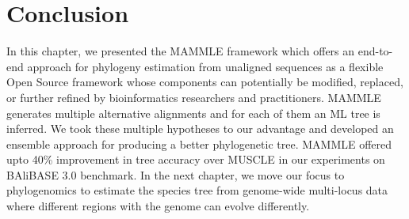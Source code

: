 \section{Conclusion}
In this chapter, we presented the MAMMLE framework which offers an end-to-end approach for phylogeny estimation from unaligned sequences as a flexible Open Source framework whose components can potentially be modified, replaced, or further refined by bioinformatics researchers and practitioners. MAMMLE generates multiple alternative alignments and for each of them an ML tree is inferred. We took these multiple hypotheses to our advantage and developed an ensemble approach for producing a better phylogenetic tree. MAMMLE offered upto 40\% improvement in tree accuracy over MUSCLE in our experiments on BAliBASE 3.0 benchmark.
In the next chapter, we move our focus to phylogenomics to estimate the species tree from genome-wide multi-locus data where different regions with the genome can evolve differently. 

